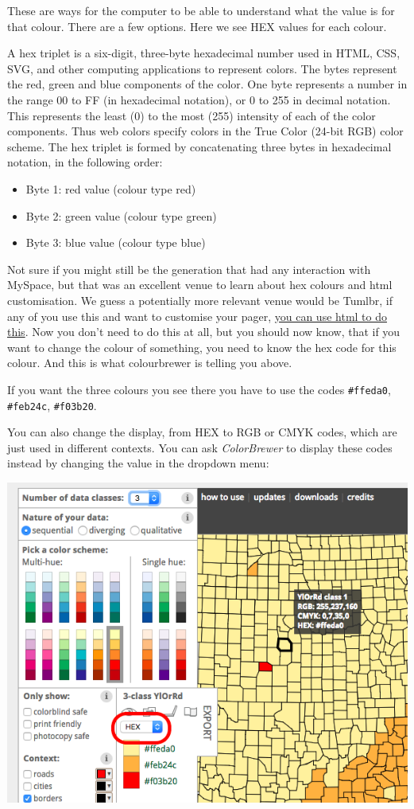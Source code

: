 \documentclass[
]{book}
\providecommand{\tightlist}{%
  \setlength{\itemsep}{0pt}\setlength{\parskip}{0pt}}
\begin{document}
These are ways for the computer to be able to understand what the value is for that colour. There are a few options. Here we see HEX values for each colour.

A hex triplet is a six-digit, three-byte hexadecimal number used in HTML, CSS, SVG, and other computing applications to represent colors. The bytes represent the red, green and blue components of the color. One byte represents a number in the range 00 to FF (in hexadecimal notation), or 0 to 255 in decimal notation. This represents the least (0) to the most (255) intensity of each of the color components. Thus web colors specify colors in the True Color (24-bit RGB) color scheme. The hex triplet is formed by concatenating three bytes in hexadecimal notation, in the following order:

\begin{itemize}
\tightlist
\item
  Byte 1: red value (colour type red)
\item
  Byte 2: green value (colour type green)
\item
  Byte 3: blue value (colour type blue)
\end{itemize}

Not sure if you might still be the generation that had any interaction with MySpace, but that was an excellent venue to learn about hex colours and html customisation. We guess a potentially more relevant venue would be Tumlbr, if any of you use this and want to customise your pager, \href{https://www.tumblr.com/docs/en/custom_themes}{you can use html to do this}. Now you don't need to do this at all, but you should now know, that if you want to change the colour of something, you need to know the hex code for this colour. And this is what colourbrewer is telling you above.

If you want the three colours you see there you have to use the codes \texttt{\#ffeda0}, \texttt{\#feb24c}, \texttt{\#f03b20}.

You can also change the display, from HEX to RGB or CMYK codes, which are just used in different contexts. You can ask \emph{ColorBrewer} to display these codes instead by changing the value in the dropdown menu:

\includegraphics{imgs/choose_col_code.png}
\end{document}
